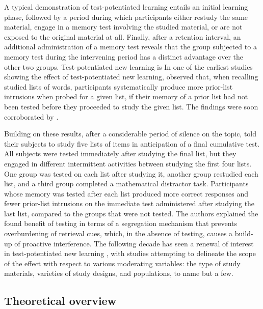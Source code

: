 \documentclass[../main.tex]{subfiles}
\begin{document}
A typical demonstration of test-potentiated learning entails an initial learning phase, followed by a period during which participants either restudy the same material, engage in a memory test involving the studied material, or are not exposed to the original material at all. Finally, after a retention interval, an additional administration of a memory test reveals that the group subjected to a memory test during the intervening period has a distinct advantage over the other two groups. Test-potentiated new learning is  In one of the earliest studies showing the effect of test-potentiated new learning, \cite{darleyEffectsPriorFree1971} observed that, when recalling studied lists of words, participants systematically produce more prior-list intrusions when probed for a given list, if their memory of a prior list had not been tested before they proceeded to study the given list. The findings were soon corroborated by \cite{tulvingNegativeTransferEffects1974}.

Building on these results, after a considerable period of silence on the topic, \cite{szpunarTestingStudyInsulates2008} told their subjects to study five lists of items in anticipation of a final cumulative test. All subjects were tested immediately after studying the final list, but they engaged in different intermittent activities between studying the first four lists. One group was tested on each list after studying it, another group restudied each list, and a third group completed a mathematical distractor task. Participants whose memory was tested after each list produced more correct responses and fewer prior-list intrusions on the immediate test administered after studying the last list, compared to the groups that were not tested. The authors explained the found benefit of testing in terms of a segregation mechanism that prevents overburdening of retrieval cues, which, in the absence of testing, causes a build-up of proactive interference. The following decade has seen a renewal of interest in test-potentiated new learning \citep{chanRetrievalPotentiatesNew2018, pastotterRetrievalPracticeEnhances2014, yangEnhancingLearningRetrieval2018}, with studies attempting to delineate the scope of the effect with respect to various moderating variables: the type of study materials, varieties of study designs, and populations, to name but a few. 

\subsection{Theoretical overview}
\end{document}
